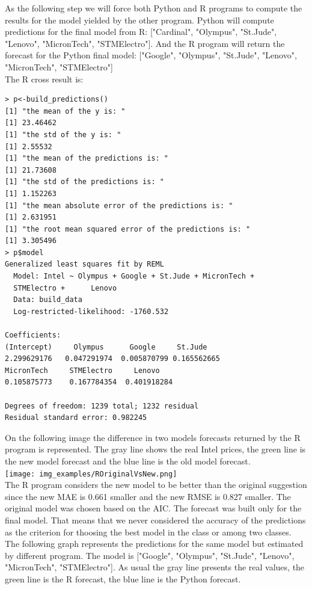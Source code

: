 \documentclass [twoside,
  11pt, a4paper,
  footinclude=true,
  headinclude=true,
  cleardoublepage=empty
]{article}
\begin{document}
As the following step we will force both Python and R programs to compute the results for the model yielded by the other program. Python will compute predictions for the final model from R: ["Cardinal", "Olympus", "St.Jude", "Lenovo", "MicronTech", "STMElectro"]. And the R program will return the forecast for the Python final model: ["Google", "Olympus", "St.Jude", "Lenovo", "MicronTech", "STMElectro"]\\
The R cross result is:
\begin{verbatim}
> p<-build_predictions()
[1] "the mean of the y is: "
[1] 23.46462
[1] "the std of the y is: "
[1] 2.55532
[1] "the mean of the predictions is: "
[1] 21.73608
[1] "the std of the predictions is: "
[1] 1.152263
[1] "the mean absolute error of the predictions is: "
[1] 2.631951
[1] "the root mean squared error of the predictions is: "
[1] 3.305496
> p$model
Generalized least squares fit by REML
  Model: Intel ~ Olympus + Google + St.Jude + MicronTech + 
  STMElectro +      Lenovo 
  Data: build_data 
  Log-restricted-likelihood: -1760.532

Coefficients:
(Intercept)     Olympus      Google     St.Jude  
2.299629176   0.047291974  0.005870799 0.165562665
MicronTech     STMElectro     Lenovo 
0.105875773    0.167784354  0.401918284 

Degrees of freedom: 1239 total; 1232 residual
Residual standard error: 0.982245 
\end{verbatim}
On the following image the difference in two models forecasts returned by the R program is represented. The gray line shows the real Intel prices, the green line is the new model forecast and the blue line is the old model forecast.\\
\texttt{[image: img\_examples/ROriginalVsNew.png]}\\
The R program considers the new model to be better than the original suggestion since the new MAE is 0.661 smaller and the new RMSE is 0.827 smaller. The original model was chosen based on the AIC. The forecast was built only for the final model. That means that we never considered the accuracy of the predictions as the criterion for thoosing the best model in the class or among two classes.\\
The following graph represents the predictions for the same model but estimated by different program. The model is ["Google", "Olympus", "St.Jude", "Lenovo", "MicronTech", "STMElectro"]. As usual the gray line presents the real values, the green line is the R forecast, the blue line is the Python forecast.\\
\end{document}
